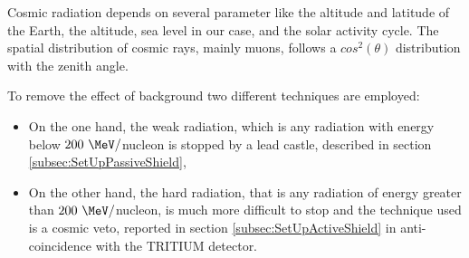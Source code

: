 Cosmic radiation depends on several parameter like the altitude and latitude of the Earth, the altitude, sea level in our case, and the solar activity cycle. The spatial distribution of cosmic rays, mainly muons, follows a $cos^2(\theta)$ distribution with the zenith angle. %

To remove the effect of background two different techniques are employed:

\begin{itemize}

\item{}  On the one hand, the weak radiation, which is any radiation with energy below $200~\MeV/$nucleon is stopped by a lead castle, described in section \ref{subsec:SetUpPassiveShield},

\item{} On the other hand, the hard radiation, that is any radiation of energy greater than $200~\MeV/$nucleon, is much more difficult to stop and the technique used is a cosmic veto, reported in section \ref{subsec:SetUpActiveShield} in anti-coincidence with the TRITIUM detector. %

\end{itemize}